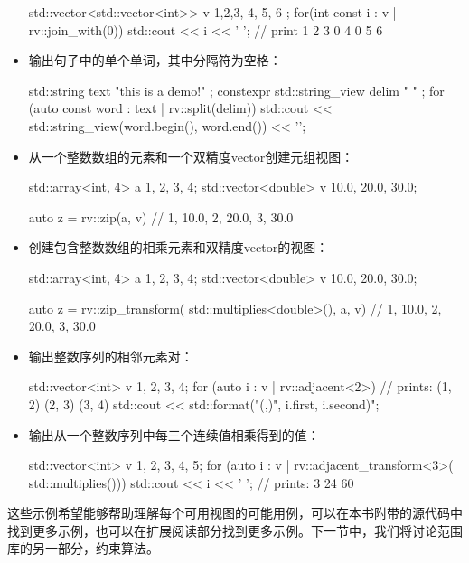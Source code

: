 \begin{itemize}
\begin{cpp}
std::vector<std::vector<int>> v{
	{1,2,3}, {4}, {5, 6}
};
for(int const i : v | rv::join_with(0))
	std::cout << i << ' '; // print 1 2 3 0 4 0 5 6
\end{cpp}

\item
输出句子中的单个单词，其中分隔符为空格：

\begin{cpp}
std::string text{ "this is a demo!" };
constexpr std::string_view delim{ " " };
for (auto const word : text | rv::split(delim))
{
	std::cout << std::string_view(word.begin(),
								  word.end())
			  << '\n';
}
\end{cpp}

\item
从一个整数数组的元素和一个双精度vector创建元组视图：

\begin{cpp}
std::array<int, 4> a {1, 2, 3, 4};
std::vector<double> v {10.0, 20.0, 30.0};

auto z = rv::zip(a, v)
// { {1, 10.0}, {2, 20.0}, {3, 30.0} }
\end{cpp}

\item
创建包含整数数组的相乘元素和双精度vector的视图：

\begin{cpp}
std::array<int, 4> a {1, 2, 3, 4};
std::vector<double> v {10.0, 20.0, 30.0};

auto z = rv::zip_transform(
	std::multiplies<double>(), a, v)
// { {1, 10.0}, {2, 20.0}, {3, 30.0} }
\end{cpp}

\item
输出整数序列的相邻元素对：

\begin{cpp}
std::vector<int> v {1, 2, 3, 4};
for (auto i : v | rv::adjacent<2>)
{
	// prints: (1, 2) (2, 3) (3, 4)
	std::cout << std::format("({},{})",
							 i.first, i.second)";
}
\end{cpp}

\item
输出从一个整数序列中每三个连续值相乘得到的值：

\begin{cpp}
std::vector<int> v {1, 2, 3, 4, 5};
for (auto i : v | rv::adjacent_transform<3>(
	std::multiplies()))
{
	std::cout << i << ' '; // prints: 3 24 60
}
\end{cpp}

\end{itemize}

这些示例希望能够帮助理解每个可用视图的可能用例，可以在本书附带的源代码中找到更多示例，也可以在扩展阅读部分找到更多示例。下一节中，我们将讨论范围库的另一部分，约束算法。












